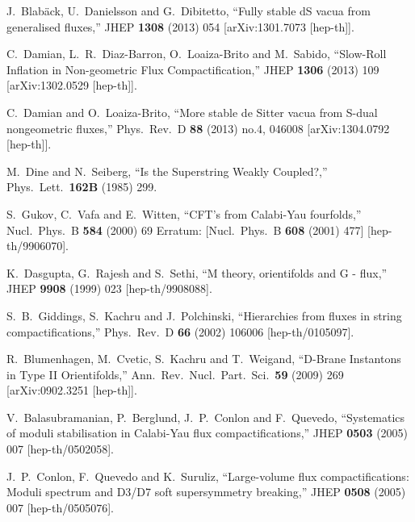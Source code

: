 \documentclass[11pt,a4paper]{article}
\begin{document}
\begin{itemize}
\begin{thebibliography}{99}
  J.~Blab\"ack, U.~Danielsson and G.~Dibitetto,
  ``Fully stable dS vacua from generalised fluxes,''
  JHEP {\bf 1308} (2013) 054
  [arXiv:1301.7073 [hep-th]].

  C.~Damian, L.~R.~Diaz-Barron, O.~Loaiza-Brito and M.~Sabido,
  ``Slow-Roll Inflation in Non-geometric Flux Compactification,''
  JHEP {\bf 1306} (2013) 109
  [arXiv:1302.0529 [hep-th]].
	
  C.~Damian and O.~Loaiza-Brito,
  ``More stable de Sitter vacua from S-dual nongeometric fluxes,''
  Phys.\ Rev.\ D {\bf 88} (2013) no.4,  046008
  [arXiv:1304.0792 [hep-th]].

  M.~Dine and N.~Seiberg,
  ``Is the Superstring Weakly Coupled?,''
  Phys.\ Lett.\  {\bf 162B} (1985) 299.

  S.~Gukov, C.~Vafa and E.~Witten,
  ``CFT's from Calabi-Yau fourfolds,''
  Nucl.\ Phys.\ B {\bf 584} (2000) 69
   Erratum: [Nucl.\ Phys.\ B {\bf 608} (2001) 477]
  [hep-th/9906070].

  K.~Dasgupta, G.~Rajesh and S.~Sethi,
  ``M theory, orientifolds and G - flux,''
  JHEP {\bf 9908} (1999) 023
  [hep-th/9908088].

  S.~B.~Giddings, S.~Kachru and J.~Polchinski,
  ``Hierarchies from fluxes in string compactifications,''
  Phys.\ Rev.\ D {\bf 66} (2002) 106006
  [hep-th/0105097].

  R.~Blumenhagen, M.~Cvetic, S.~Kachru and T.~Weigand,
  ``D-Brane Instantons in Type II Orientifolds,''
  Ann.\ Rev.\ Nucl.\ Part.\ Sci.\  {\bf 59} (2009) 269
  [arXiv:0902.3251 [hep-th]].

  V.~Balasubramanian, P.~Berglund, J.~P.~Conlon and F.~Quevedo,
  ``Systematics of moduli stabilisation in Calabi-Yau flux compactifications,''
  JHEP {\bf 0503} (2005) 007
  [hep-th/0502058].

  J.~P.~Conlon, F.~Quevedo and K.~Suruliz,
  ``Large-volume flux compactifications: Moduli spectrum and D3/D7 soft supersymmetry breaking,''
  JHEP {\bf 0508} (2005) 007
  [hep-th/0505076].


\end{thebibliography}
\end{itemize}
\end{document}
